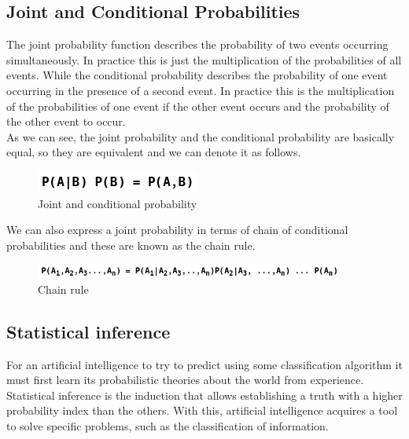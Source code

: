 \documentclass[sigconf,12pt,review=false,natbib=false]{acmart}
\begin{document}
\subsection{Joint and Conditional Probabilities}

The joint probability function describes the probability of two events occurring simultaneously. In
practice this is just the multiplication of the probabilities of all events. While the conditional
probability describes the probability of one event occurring in the presence of a second event. In
practice this is the multiplication of the probabilities of one event if the other event occurs and
the probability of the other event to occur. \\

As we can see, the joint probability and the conditional probability are basically equal, so they are
equivalent and we can denote it as follows.

\begin{figure}[h!]
    \centering
    \includegraphics[]{jcp_relationship}
    \caption{Joint and conditional probability}
    \label{fig:jcp_relationship}
\end{figure}

We can also express a joint probability in terms of chain of conditional probabilities and these are
known as the chain rule. \\

\begin{figure}[h!]
    \centering
    \includegraphics[width=4in]{chain_rule}
    \caption{Chain rule}
    \label{fig:jcp_relationship}
\end{figure}


\subsection{Statistical inference}

For an artificial intelligence to try to predict using some classification algorithm it must first learn its
probabilistic theories about the world from experience. 
Statistical inference is the induction that allows establishing a truth with a higher probability index than
the others. With this, artificial intelligence acquires a tool to solve specific problems, such as the classification
of information. \\
\end{document}
